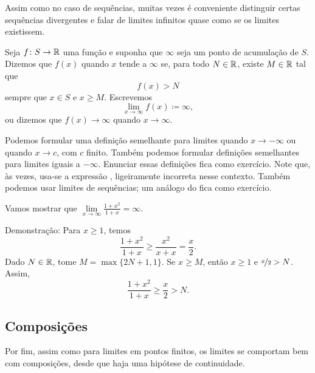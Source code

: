Assim como no caso de sequências, muitas vezes é conveniente distinguir certas
sequências divergentes e falar de limites infinitos
quase como se os limites existissem.

\begin{defn}
%
Seja $f \colon S \to {\mathbb{R}}$ uma função e suponha que
$\infty$ seja um ponto de acumulação de $S$.
Dizemos que $f(x)$
\emph{}
quando $x$ tende a $\infty$
se, para todo $N \in {\mathbb{R}}$,
existe $M \in {\mathbb{R}}$ tal que
\begin{equation*}
f(x) > N
\end{equation*}
sempre que $x \in S$ e $x \geq M$.
Escrevemos
\begin{equation*}
\lim_{x \to \infty} f(x) \coloneqq \infty ,
\end{equation*}
ou dizemos que $f(x) \to \infty$ quando $x \to \infty$.
\end{defn}

Podemos formular uma definição semelhante para limites quando $x \to -\infty$
ou quando $x \to c$, com $c$ finito. Também podemos formular definições
semelhantes para limites iguais a $-\infty$. Enunciar essas definições fica
como exercício.
Note que, às vezes, usa-se a expressão
\emph{}, ligeiramente incorreta
nesse contexto.
Também podemos usar limites de sequências; um análogo do
 fica como exercício.

\begin{example}
Vamos mostrar que $\lim\limits_{x \to \infty} \frac{1+x^2}{1+x} = \infty$.

Demonstração: Para $x \geq 1$, temos
\begin{equation*}
\frac{1+x^2}{1+x} \geq
\frac{x^2}{x+x}  =
\frac{x}{2} .
\end{equation*}
Dado $N \in {\mathbb{R}}$, tome $M = \max \{ 2N+1 , 1 \}$.
Se $x \geq M$, então $x \geq 1$ e $\nicefrac{x}{2} > N$.
Assim,
\begin{equation*}
\frac{1+x^2}{1+x} \geq
\frac{x}{2} > N .
\end{equation*}
\end{example}

\subsection{Composições}

Por fim, assim como para limites em pontos finitos,
os limites se comportam bem com composições, desde que haja uma
hipótese de continuidade.

